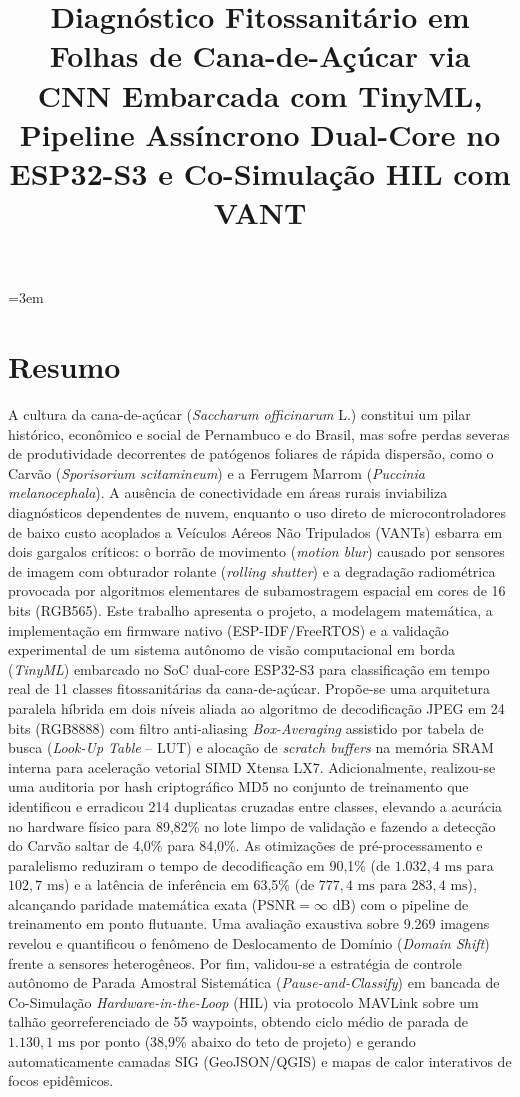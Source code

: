 \documentclass[12pt]{article}
\title{Diagnóstico Fitossanitário em Folhas de Cana-de-Açúcar via CNN Embarcada com TinyML, Pipeline Assíncrono Dual-Core no ESP32-S3 e Co-Simulação HIL com VANT}
\begin{document}
\emergencystretch=3em

\maketitle
\thispagestyle{plain}

\section*{Resumo}
A cultura da cana-de-açúcar (\textit{Saccharum officinarum} L.) constitui um pilar histórico, econômico e social de Pernambuco e do Brasil, mas sofre perdas severas de produtividade decorrentes de patógenos foliares de rápida dispersão, como o Carvão (\textit{Sporisorium scitamineum}) e a Ferrugem Marrom (\textit{Puccinia melanocephala}). A ausência de conectividade em áreas rurais inviabiliza diagnósticos dependentes de nuvem, enquanto o uso direto de microcontroladores de baixo custo acoplados a Veículos Aéreos Não Tripulados (VANTs) esbarra em dois gargalos críticos: o borrão de movimento (\textit{motion blur}) causado por sensores de imagem com obturador rolante (\textit{rolling shutter}) e a degradação radiométrica provocada por algoritmos elementares de subamostragem espacial em cores de 16 bits (RGB565). Este trabalho apresenta o projeto, a modelagem matemática, a implementação em firmware nativo (ESP-IDF/FreeRTOS) e a validação experimental de um sistema autônomo de visão computacional em borda (\textit{TinyML}) embarcado no SoC dual-core ESP32-S3 para classificação em tempo real de 11 classes fitossanitárias da cana-de-açúcar. Propõe-se uma arquitetura paralela híbrida em dois níveis aliada ao algoritmo de decodificação JPEG em 24 bits (RGB8888) com filtro anti-aliasing \textit{Box-Averaging} assistido por tabela de busca (\textit{Look-Up Table} -- LUT) e alocação de \textit{scratch buffers} na memória SRAM interna para aceleração vetorial SIMD Xtensa LX7. Adicionalmente, realizou-se uma auditoria por hash criptográfico MD5 no conjunto de treinamento que identificou e erradicou 214 duplicatas cruzadas entre classes, elevando a acurácia no hardware físico para 89,82\% no lote limpo de validação e fazendo a detecção do Carvão saltar de 4,0\% para 84,0\%. As otimizações de pré-processamento e paralelismo reduziram o tempo de decodificação em 90,1\% (de $1.032,4\text{ ms}$ para $102,7\text{ ms}$) e a latência de inferência em 63,5\% (de $777,4\text{ ms}$ para $283,4\text{ ms}$), alcançando paridade matemática exata ($\text{PSNR} = \infty\text{ dB}$) com o pipeline de treinamento em ponto flutuante. Uma avaliação exaustiva sobre 9.269 imagens revelou e quantificou o fenômeno de Deslocamento de Domínio (\textit{Domain Shift}) frente a sensores heterogêneos. Por fim, validou-se a estratégia de controle autônomo de Parada Amostral Sistemática (\textit{Pause-and-Classify}) em bancada de Co-Simulação \textit{Hardware-in-the-Loop} (HIL) via protocolo MAVLink sobre um talhão georreferenciado de 55 waypoints, obtendo ciclo médio de parada de $1.130,1\text{ ms}$ por ponto (38,9\% abaixo do teto de projeto) e gerando automaticamente camadas SIG (GeoJSON/QGIS) e mapas de calor interativos de focos epidêmicos.
\end{document}
